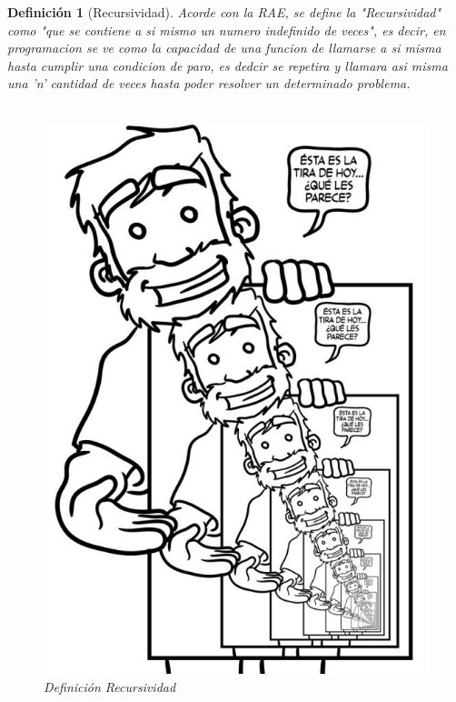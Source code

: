 \documentclass[12pt,twoside]{article}
\newtheorem{defi}{Definición}
\begin{document}
\begin{defi}[Recursividad]
Acorde con la RAE, se define la "Recursividad" como "que se contiene a si mismo un numero indefinido de veces", es decir, en programacion se ve como la capacidad de una funcion de llamarse a si misma hasta cumplir una condicion de paro, es dedcir se repetira y llamara asi misma una 'n' cantidad de veces hasta poder resolver un determinado problema. 
\\
\\
\begin{figure}[h!]
\centering
\includegraphics[scale=.2]{recur.jpeg}
\caption{Definición Recursividad}
\label{fig:universe}
\end{figure}
\end{defi}
\end{document}
